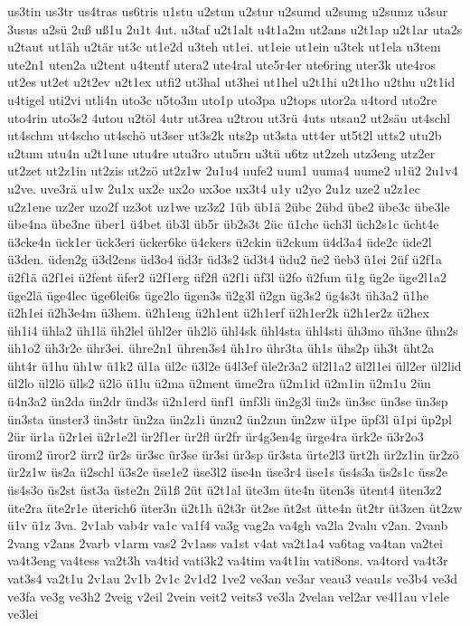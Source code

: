 {us3tin
us3tr
us4tras
us6tris
u1stu
u2stun
u2stur
u2sumd
u2sumg
u2sumz
u3sur
3usus
u2sü
2uß
uß1u
2u1t
4ut.
u3taf
u2t1alt
u4t1a2m
ut2ans
u2t1ap
u2t1ar
uta2s
u2taut
ut1äh
u2tär
ut3c
ut1e2d
u3teh
ut1ei.
ut1eie
ut1ein
u3tek
ut1ela
u3tem
ute2n1
uten2a
u2tent
u4tentf
utera2
ute4ral
ute5r4er
ute6ring
uter3k
ute4ros
ut2es
ut2et
u2t2ev
u2t1ex
utfi2
ut3hal
ut3hei
ut1hel
u2t1hi
u2t1ho
u2thu
u2t1id
u4tigel
uti2vi
utli4n
uto3c
u5to3m
uto1p
uto3pa
u2tops
utor2a
u4tord
uto2re
uto4rin
uto3s2
4utou
u2töl
4utr
ut3rea
u2trou
ut3rü
4uts
utsau2
ut2säu
ut4schl
ut4schm
ut4scho
ut4schö
ut3ser
ut3s2k
uts2p
ut3sta
utt4er
ut5t2l
utts2
utu2b
u2tum
utu4n
u2t1une
utu4re
utu3ro
utu5ru
u3tü
u6tz
ut2zeh
utz3eng
utz2er
ut2zet
ut2z1in
ut2zis
ut2zö
ut2z1w
2u1u4
uufe2
uum1
uuma4
uume2
u1ü2
2u1v4
u2ve.
uve3rä
u1w
2u1x
ux2e
ux2o
ux3oe
ux3t4
u1y
u2yo
2u1z
uze2
u2z1ec
u2z1ene
uz2er
uzo2f
uz3ot
uz1we
uz3z2
1üb
üb1ä
2übc
2übd
übe2
übe3c
übe3le
übe4na
übe3ne
über1
ü4bet
üb3l
üb5r
üb2s3t
2üc
ü1che
üch3l
üch2s1c
ücht4e
ü3cke4n
ück1er
ück3eri
ücker6ke
ü4ckers
ü2ckin
ü2ckum
ü4d3a4
üde2c
üde2l
ü3den.
üden2g
ü3d2ens
üd3o4
üd3r
üd3s2
üd3t4
üdu2
üe2
üeb3
ü1ei
2üf
ü2f1a
ü2f1ä
ü2f1ei
ü2fent
üfer2
ü2f1erg
üf2fl
ü2f1i
üf3l
ü2fo
ü2fum
ü1g
üg2e
üge2l1a2
üge2lä
üge4lec
üge6lei6s
üge2lo
ügen3s
ü2g3l
ü2gn
üg3s2
üg4s3t
üh3a2
ü1he
ü2h1ei
ü2h3e4m
ü3hem.
ü2h1eng
ü2h1ent
ü2h1erf
ü2h1er2k
ü2h1er2z
ü2hex
üh1i4
ühla2
üh1lä
üh2lel
ühl2er
üh2lö
ühl4sk
ühl4sta
ühl4sti
üh3mo
üh3ne
ühn2s
üh1o2
üh3r2e
ühr3ei.
ühre2n1
ühren3s4
üh1ro
ühr3ta
üh1s
ühs2p
üh3t
üht2a
üht4r
ü1hu
üh1w
ü1k2
ül1a
ül2c
ü3l2e
ü4l3ef
üle2r3a2
ül2l1a2
ül2l1ei
üll2er
ül2lid
ül2lo
ül2lö
ülls2
ü2lö
ü1lu
ü2ma
ü2ment
üme2ra
ü2m1id
ü2m1in
ü2m1u
2ün
ü4n3a2
ün2da
ün2dr
ünd3s
ü2n1erd
ünf1
ünf3li
ün2g3l
ün2s
ün3sc
ün3se
ün3sp
ün3sta
ünster3
ün3str
ün2za
ün2z1i
ünzu2
ün2zun
ün2zw
ü1pe
üpf3l
ü1pi
üp2pl
2ür
ür1a
ü2r1ei
ü2r1e2l
ür2f1er
ür2fl
ür2fr
ür4g3en4g
ürge4ra
ürk2e
ü3r2o3
ürom2
üror2
ürr2
ür2s
ür3sc
ür3se
ür3si
ür3sp
ür3sta
ürte2l3
ürt2h
ür2z1in
ür2zö
ür2z1w
üs2a
ü2schl
ü3s2e
üse1e2
üse3l2
üse4n
üse3r4
üse1s
üs4s3a
üs2s1c
üss2e
üs4s3o
üs2st
üst3a
üste2n
2ü1ß
2üt
ü2t1al
üte3m
üte4n
üten3s
ütent4
üten3z2
üte2ra
üte2r1e
üterich6
üter3n
ü2t1h
ü2t3r
üt2se
üt2st
ütte4n
üt2tr
üt3zen
üt2zw
ü1v
ü1z
3va.
2v1ab
vab4r
va1c
va1f4
va3g
vag2a
va4gh
va2la
2valu
v2an.
2vanb
2vang
v2ans
2varb
v1arm
vas2
2v1ass
va1st
v4at
va2t1a4
va6tag
va4tan
va2tei
va4t3eng
va4tess
va2t3h
va4tid
vati3k2
va4tim
va4t1in
vati8ons.
va4tord
va4t3r
vat3s4
va2t1u
2v1au
2v1b
2v1c
2v1d2
1ve2
ve3an
ve3ar
veau3
veau1s
ve3b4
ve3d
ve3fa
ve3g
ve3h2
2veig
v2eil
2vein
veit2
veits3
ve3la
2velan
vel2ar
ve4l1au
v1ele
ve3lei
}
